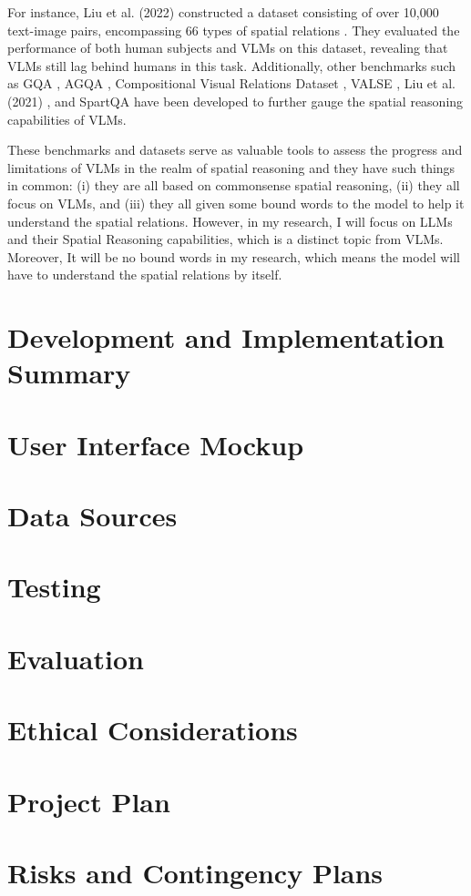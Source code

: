 \documentclass[journal,10pt]{IEEEtran}
\begin{document}
For instance, Liu et al. (2022) constructed a dataset consisting of over 10,000 text-image pairs, encompassing 66 types of spatial relations \cite{liu2022visual}. They evaluated the performance of both human subjects and VLMs on this dataset, revealing that VLMs still lag behind humans in this task. Additionally, other benchmarks such as GQA \cite{hudson2019gqa}, AGQA \cite{grunde2021agqa}, Compositional Visual Relations Dataset \cite{zerroug2022benchmark}, VALSE \cite{parcalabescu2021valse}, Liu et al. (2021) \cite{liu2022things}, and SpartQA \cite{mirzaee2021spartqa} have been developed to further gauge the spatial reasoning capabilities of VLMs.

These benchmarks and datasets serve as valuable tools to assess the progress and limitations of VLMs in the realm of spatial reasoning and they have such things in common: (i) they are all based on commonsense spatial reasoning, (ii) they all focus on VLMs, and (iii) they all given some bound words to the model to help it understand the spatial relations. However, in my research, I will focus on LLMs and their Spatial Reasoning capabilities, which is a distinct topic from VLMs. Moreover, It will be no bound words in my research, which means the model will have to understand the spatial relations by itself.

\section{Development and Implementation Summary}

\section{User Interface Mockup}
\section{Data Sources}
\section{Testing}
\section{Evaluation}
\section{Ethical Considerations}
\section{Project Plan}
\section{Risks and Contingency Plans}



\end{document}
